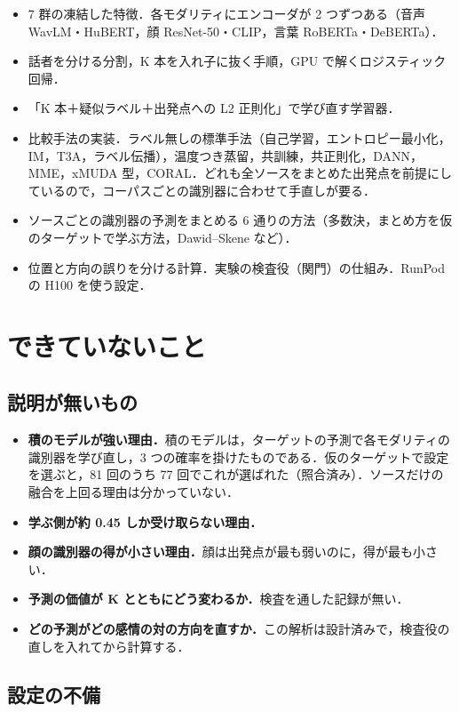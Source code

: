 \documentclass[11pt,a4paper]{ltjsarticle}
\begin{document}
\begin{itemize}
  \item 7 群の凍結した特徴．各モダリティにエンコーダが 2 つずつある（音声 WavLM・HuBERT，顔 ResNet-50・CLIP，言葉 RoBERTa・DeBERTa）．
  \item 話者を分ける分割，K 本を入れ子に抜く手順，GPU で解くロジスティック回帰．
  \item 「K 本＋疑似ラベル＋出発点への L2 正則化」で学び直す学習器．
  \item 比較手法の実装．ラベル無しの標準手法（自己学習，エントロピー最小化，IM，T3A，ラベル伝播），温度つき蒸留，共訓練，共正則化，DANN，MME，xMUDA 型，CORAL．どれも全ソースをまとめた出発点を前提にしているので，コーパスごとの識別器に合わせて手直しが要る．
  \item ソースごとの識別器の予測をまとめる 6 通りの方法（多数決，まとめ方を仮のターゲットで学ぶ方法，Dawid--Skene など）．
  \item 位置と方向の誤りを分ける計算．実験の検査役（関門）の仕組み．RunPod の H100 を使う設定．
\end{itemize}

\section{できていないこと}

\subsection{説明が無いもの}

\begin{itemize}
  \item \textbf{積のモデルが強い理由．}積のモデルは，ターゲットの予測で各モダリティの識別器を学び直し，3 つの確率を掛けたものである．仮のターゲットで設定を選ぶと，81 回のうち 77 回でこれが選ばれた（照合済み）．ソースだけの融合を上回る理由は分かっていない．
  \item \textbf{学ぶ側が約 0.45 しか受け取らない理由．}
  \item \textbf{顔の識別器の得が小さい理由．}顔は出発点が最も弱いのに，得が最も小さい．
  \item \textbf{予測の価値が K とともにどう変わるか．}検査を通した記録が無い．
  \item \textbf{どの予測がどの感情の対の方向を直すか．}この解析は設計済みで，検査役の直しを入れてから計算する．
\end{itemize}

\subsection{設定の不備}
\end{document}
